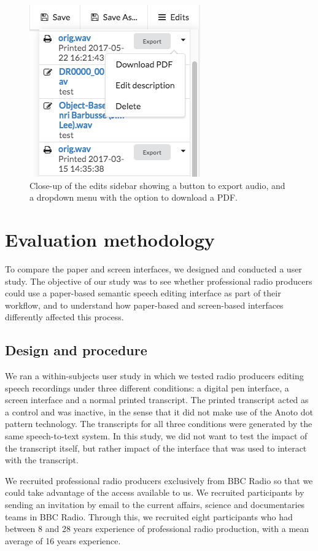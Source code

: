 \begin{figure}[p]
  \centering
  \includegraphics[width=0.4\columnwidth]{figs/discourse-download-pdf.png}
  \caption{Close-up of the edits sidebar showing a button to export audio, and a dropdown menu with the option to
  download a PDF.}
  \label{fig:download-pdf}
\end{figure}

\section{Evaluation methodology}\label{sec:method}

To compare the paper and screen interfaces, we designed and conducted a user study.  The objective of our study was to
see whether professional radio producers could use a paper-based semantic speech editing interface as part of their
workflow, and to understand how paper-based and screen-based interfaces differently affected this process.

\subsection{Design and procedure}
We ran a within-subjects user study in which we tested radio producers editing speech recordings under three different
conditions: a digital pen interface, a screen interface and a normal printed transcript. The printed transcript acted
as a control and was inactive, in the sense that it did not make use of the Anoto dot pattern technology.  The
transcripts for all three conditions were generated by the same speech-to-text system. In this study, we did not want
to test the impact of the transcript itself, but rather impact of the interface that was used to interact with the
transcript.

We recruited professional radio producers exclusively from BBC Radio so that we could take advantage of the access 
available to us. We recruited participants by sending an invitation by email to the current affairs, science and
documentaries teams in BBC Radio.  Through this, we recruited eight participants who had between 8 and 28 years
experience of professional radio production, with a mean average of 16 years experience.

